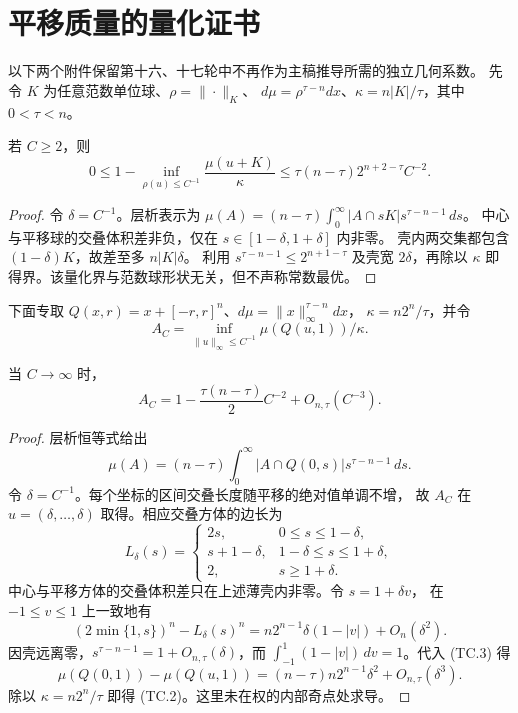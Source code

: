 \section*{平移质量的量化证书}
以下两个附件保留第十六、十七轮中不再作为主稿推导所需的独立几何系数。
先令 $K$ 为任意范数单位球、$\rho=\|\cdot\|_K$、
$d\mu=\rho^{\tau-n}dx$、$\kappa=n|K|/\tau$，其中 $0<\tau<n$。
\begin{lemma}\label{cert:norm-shift}
若 $C\ge2$，则
\[0\le1-\inf_{\rho(u)\le C^{-1}}\frac{\mu(u+K)}\kappa
\le\tau(n-\tau)2^{n+2-\tau}C^{-2}.\tag{TC.1}\]
\end{lemma}
\begin{proof}
令 $\delta=C^{-1}$。层析表示为
$\mu(A)=(n-\tau)\int_0^\infty|A\cap sK|s^{\tau-n-1}\,ds$。
中心与平移球的交叠体积差非负，仅在 $s\in[1-\delta,1+\delta]$ 内非零。
壳内两交集都包含 $(1-\delta)K$，故差至多 $n|K|\delta$。
利用 $s^{\tau-n-1}\le2^{n+1-\tau}$ 及壳宽 $2\delta$，再除以
$\kappa$ 即得界。该量化界与范数球形状无关，但不声称常数最优。
\end{proof}
下面专取 $Q(x,r)=x+[-r,r]^n$、$d\mu=\|x\|_\infty^{\tau-n}dx$，
$\kappa=n2^n/\tau$，并令
\[A_C=\inf_{\|u\|_\infty\le C^{-1}}\mu(Q(u,1))/\kappa.\]
\begin{lemma}[平移损失]\label{cert:cube-shift}
当 $C\to\infty$ 时，
\[A_C=1-\frac{\tau(n-\tau)}2C^{-2}+O_{n,\tau}(C^{-3}).\tag{TC.2}\]
\end{lemma}
\begin{proof}
层析恒等式给出
\[\mu(A)=(n-\tau)\int_0^\infty |A\cap Q(0,s)|s^{\tau-n-1}\,ds.\tag{TC.3}\]
令 $\delta=C^{-1}$。每个坐标的区间交叠长度随平移的绝对值单调不增，
故 $A_C$ 在 $u=(\delta,\ldots,\delta)$ 取得。相应交叠方体的边长为
\[L_\delta(s)=\begin{cases}
2s,&0\le s\le1-\delta,\\
s+1-\delta,&1-\delta\le s\le1+\delta,\\
2,&s\ge1+\delta.
\end{cases}\]
中心与平移方体的交叠体积差只在上述薄壳内非零。令 $s=1+\delta v$，
在 $-1\le v\le1$ 上一致地有
\[(2\min\{1,s\})^n-L_\delta(s)^n
=n2^{n-1}\delta(1-|v|)+O_n(\delta^2).\]
因壳远离零，$s^{\tau-n-1}=1+O_{n,\tau}(\delta)$，而
$\int_{-1}^1(1-|v|)\,dv=1$。代入 (TC.3) 得
\[\mu(Q(0,1))-\mu(Q(u,1))
=(n-\tau)n2^{n-1}\delta^2+O_{n,\tau}(\delta^3).
\]
除以 $\kappa=n2^n/\tau$ 即得 (TC.2)。这里未在权的内部奇点处求导。
\end{proof}
